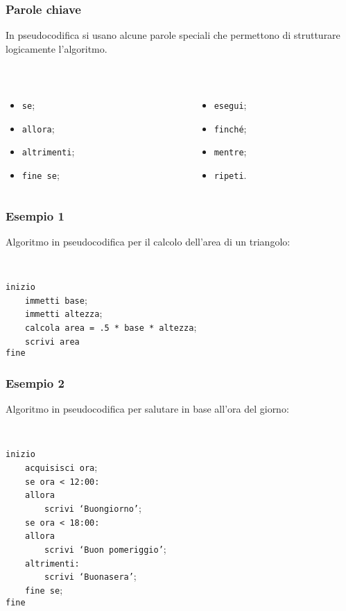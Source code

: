 \documentclass[]{beamer}
\begin{document}
\begin{frame}
\frametitle{Parole chiave}
In pseudocodifica si usano alcune parole speciali che permettono di \alert{strutturare logicamente l'algoritmo}.

~

\begin{columns}
\begin{column}{0.4\textwidth}
\begin{itemize}
  \item \texttt{se};
  \item \texttt{allora};
  \item \texttt{altrimenti};
  \item \texttt{fine se};
\end{itemize}
\end{column}
\begin{column}{0.4\textwidth}
\begin{itemize}
  \item \texttt{esegui};
  \item \texttt{finché};
  \item \texttt{mentre};
  \item \texttt{ripeti}.
\end{itemize}
\end{column}
\end{columns}
\end{frame}


\begin{frame}
\frametitle{Esempio 1}
Algoritmo in pseudocodifica per il calcolo dell'area di un triangolo:

~

\texttt{inizio}\\
~~~~\texttt{immetti base};\\
~~~~\texttt{immetti altezza};\\
~~~~\texttt{calcola area = .5 * base * altezza};\\
~~~~\texttt{scrivi area}\\
\texttt{fine}
\end{frame}


\begin{frame}
\frametitle{Esempio 2}
Algoritmo in pseudocodifica per salutare in base all'ora del giorno:

~

\texttt{inizio}\\
~~~~\texttt{acquisisci ora};\\
~~~~\texttt{se ora < 12:00:}\\
~~~~\texttt{allora}\\
~~~~~~~~\texttt{scrivi `Buongiorno'};\\
~~~~\texttt{se ora < 18:00:}\\
~~~~\texttt{allora}\\
~~~~~~~~\texttt{scrivi `Buon pomeriggio'};\\
~~~~\texttt{altrimenti:}\\
~~~~~~~~\texttt{scrivi `Buonasera'};\\
~~~~\texttt{fine se};\\
\texttt{fine}
\end{frame}
\end{document}
